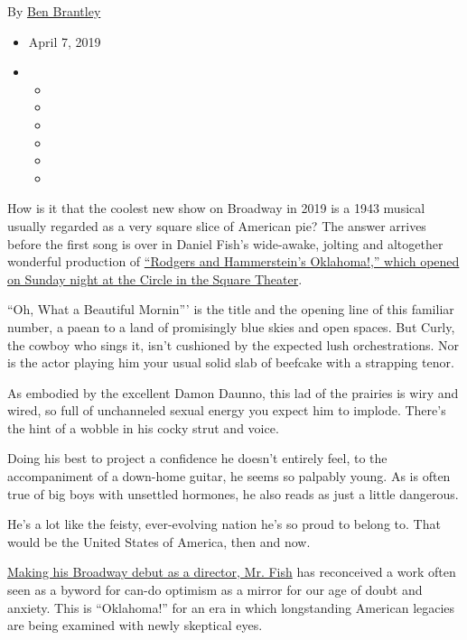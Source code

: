 By \href{https://www.nytimes3xbfgragh.onion/by/ben-brantley}{Ben
Brantley}

\begin{itemize}
\item
  April 7, 2019
\item
  \begin{itemize}
  \item
  \item
  \item
  \item
  \item
  \item
  \end{itemize}
\end{itemize}

How is it that the coolest new show on Broadway in 2019 is a 1943
musical usually regarded as a very square slice of American pie? The
answer arrives before the first song is over in Daniel Fish's
wide-awake, jolting and altogether wonderful production of
\href{https://oklahomabroadway.com/?gclid=EAIaIQobChMI-bj_vbO54QIViI3ICh2_HA6aEAAYASAAEgJEdvD_BwE\&gclsrc=aw.ds}{``Rodgers
and Hammerstein's Oklahoma!,'' which opened on Sunday night at the
Circle in the Square Theater}.

``Oh, What a Beautiful Mornin''' is the title and the opening line of
this familiar number, a paean to a land of promisingly blue skies and
open spaces. But Curly, the cowboy who sings it, isn't cushioned by the
expected lush orchestrations. Nor is the actor playing him your usual
solid slab of beefcake with a strapping tenor.

As embodied by the excellent Damon Daunno, this lad of the prairies is
wiry and wired, so full of unchanneled sexual energy you expect him to
implode. There's the hint of a wobble in his cocky strut and voice.

Doing his best to project a confidence he doesn't entirely feel, to the
accompaniment of a down-home guitar, he seems so palpably young. As is
often true of big boys with unsettled hormones, he also reads as just a
little dangerous.

He's a lot like the feisty, ever-evolving nation he's so proud to belong
to. That would be the United States of America, then and now.

\href{https://www.nytimes3xbfgragh.onion/2019/03/27/theater/daniel-fish-oklahoma.html}{Making
his Broadway debut as a director, Mr. Fish} has reconceived a work often
seen as a byword for can-do optimism as a mirror for our age of doubt
and anxiety. This is ``Oklahoma!'' for an era in which longstanding
American legacies are being examined with newly skeptical eyes.


